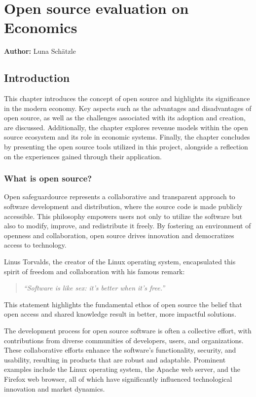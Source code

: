 \chapter{Open source evaluation on Economics}
\label{cha:Open_source_evaluation_Economics}
\textbf{Author:} Luna Schätzle

\section{Introduction}

This chapter introduces the concept of open source and highlights its significance in the modern economy. 
Key aspects such as the advantages and disadvantages of open source, as well as the challenges associated with its adoption and creation, are discussed. 
Additionally, the chapter explores revenue models within the open source ecosystem and its role in economic systems. 
Finally, the chapter concludes by presenting the open source tools utilized in this project, alongside a reflection on the experiences gained through their application.


\subsection{What is open source?}

Open safeguardource represents a collaborative and transparent approach to software development and distribution, 
where the source code is made publicly accessible. This philosophy empowers users not only to utilize the software but also to modify, 
improve, and redistribute it freely. By fostering an environment of openness and collaboration, 
open source drives innovation and democratizes access to technology.

Linus Torvalds, the creator of the Linux operating system, encapsulated this spirit of freedom and collaboration with his famous remark:

\begin{quote}
    \textit{“Software is like sex: it's better when it's free.”}
    \author{Linus Torvalds}
\end{quote}

\cite{Linus_Torvalds_quote_open_source}

This statement highlights the fundamental ethos of open source the belief that open access and shared knowledge result in better, more impactful solutions.


The development process for open source software is often a collective effort, 
with contributions from diverse communities of developers, users, and organizations. 
These collaborative efforts enhance the software's functionality, security, and usability, 
resulting in products that are robust and adaptable. Prominent examples include the Linux operating system, 
the Apache web server, and the Firefox web browser, all of which have significantly influenced technological innovation and market dynamics.

